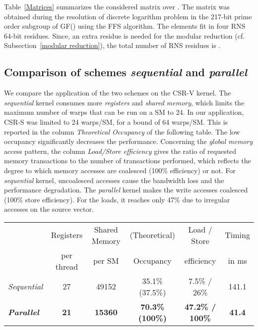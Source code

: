 \documentclass[runningheads,orivec]{llncs}
\begin{document}
Table~\ref{Matrices} summarizes the considered matrix over . The matrix was obtained during the resolution of discrete logarithm problem in the 217-bit prime order subgroup of GF() using the FFS algorithm. The  elements fit in four RNS 64-bit residues. Since, an extra residue is needed for the modular reduction (cf. Subsection~\ref{modular reduction}), the total number of RNS residues is .

\vspace*{-0.25cm}
\subsection{Comparison of schemes \textit{sequential} and \textit{parallel}}
\vspace*{-0.25cm}

We compare the application of the two schemes on the CSR-V kernel. The \textit{sequential} kernel consumes more \textit{registers} and \textit{shared memory}, which limits the maximum number of warps that can be run on a SM to 24. In our application, CSR-S was limited to 24 warps/SM, for a bound of 64 warps/SM. This is reported in the column \textit{Theoretical Occupancy} of the following table. The low occupancy significantly decreases the performance. Concerning the \textit{global memory} access pattern, the column \textit{Load/Store efficiency} gives the ratio of requested memory transactions to the number of transactions performed, which reflects the degree to which memory accesses are coalesced (100\% efficiency) or not. For \textit{sequential} kernel, uncoalesced accesses cause the bandwidth loss and the performance degradation. The \textit{parallel} kernel makes the write accesses coalesced (100\% store efficiency). For the loads, it reaches only 47\% due to irregular accesses on the source vector. 

\vspace*{-0.25cm}



  \begin{center}
    \begin{tabular}{|l||c|c|c|c||c|}
      \hline
        & \footnotesize Registers & \footnotesize Shared Memory &  \footnotesize (Theoretical) & \footnotesize Load / Store & \footnotesize Timing\\
        & \footnotesize per thread & \footnotesize per SM & \footnotesize Occupancy & \footnotesize efficiency & \footnotesize in ms \\  
      \hline
      \hline
      \small \textit{Sequential} & \footnotesize 27 & \footnotesize 49152 & \footnotesize 35.1\% (37.5\%) & \footnotesize 7.5\% / 26\% & \footnotesize 141.1\\
      \bf \small \textit{Parallel} & \bf \footnotesize 21 & \bf  \footnotesize 15360 & \bf \footnotesize 70.3\% (100\%) & \bf \footnotesize 47.2\% / 100\% & \bf \footnotesize 41.4\\
	  \hline  
    \end{tabular}
  \end{center}
\end{document}
